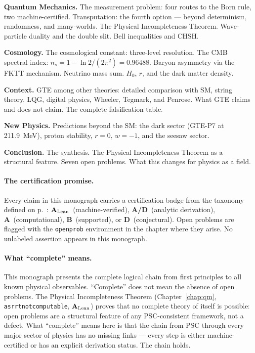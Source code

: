 \documentclass[11pt,openany]{book}
\theoremstyle{remark}
\newcommand{\lean}[1]{%
  \penalty-100
  \begingroup\def\_{\textunderscore\allowbreak}\texttt{#1}\endgroup}
\newcommand{\CatA}{\textbf{A}}
\newcommand{\CatAL}{\ensuremath{\textbf{A}_{\rm Lean}}}
\newcommand{\CatAD}{\textbf{A/D}}
\newcommand{\CatB}{\textbf{B}}
\newcommand{\CatD}{\textbf{D}}
\begin{document}
\begin{description}[leftmargin=1.5cm]
\item[Chapter~\ref{chap:qm}] \textbf{Quantum Mechanics.}
  The measurement problem: four routes to the Born rule, two machine-certified.
  Transputation: the fourth option --- beyond determinism, randomness, and many-worlds.
  The Physical Incompleteness Theorem.
  Wave-particle duality and the double slit.
  Bell inequalities and CHSH.

\item[Chapter~\ref{chap:cosmology}] \textbf{Cosmology.}
  The cosmological constant: three-level resolution.
  The CMB spectral index: $n_s = 1 - \ln2/(2\pi^2) = 0.96488$.
  Baryon asymmetry via the FKTT mechanism.
  Neutrino mass sum.
  $H_0$, $r$, and the dark matter density.

\item[Chapter~\ref{chap:context}] \textbf{Context.}
  GTE among other theories: detailed comparison with SM, string theory, LQG, digital
  physics, Wheeler, Tegmark, and Penrose.
  What GTE claims and does not claim.
  The complete falsification table.

\item[Chapter~\ref{chap:new_physics}] \textbf{New Physics.}
  Predictions beyond the SM: the dark sector (GTE-P7 at 211.9~MeV), proton stability,
  $r = 0$, $w = -1$, and the seesaw sector.

\item[Chapter~\ref{chap:conclusion}] \textbf{Conclusion.}
  The synthesis.
  The Physical Incompleteness Theorem as a structural feature.
  Seven open problems.
  What this changes for physics as a field.
\end{description}

\paragraph{The certification promise.}
Every claim in this monograph carries a certification badge from the taxonomy defined
on p.~\pageref{chap:taxonomy}: \CatAL\ (machine-verified), \CatAD\ (analytic
derivation), \CatA\ (computational), \CatB\ (supported), or \CatD\ (conjectural).
Open problems are flagged with the \texttt{openprob} environment in the chapter where
they arise.
No unlabeled assertion appears in this monograph.

\paragraph{What ``complete'' means.}
This monograph presents the complete logical chain from first principles to all known
physical observables.
``Complete'' does not mean the absence of open problems.
The Physical Incompleteness Theorem (Chapter~\ref{chap:qm}, \lean{asr\_rt\_not\_computable},
\CatAL) proves that no complete theory of itself is possible: open problems are a
structural feature of any PSC-consistent framework, not a defect.
What ``complete'' means here is that the chain from PSC through every major sector of
physics has no missing links --- every step is either machine-certified or has an
explicit derivation status.
The chain holds.
\end{document}
